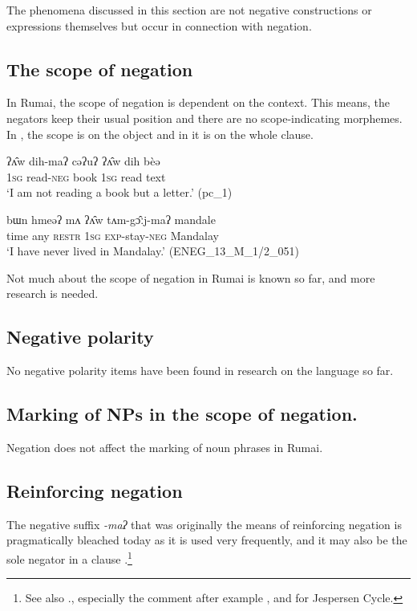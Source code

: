 \documentclass[output=paper,colorlinks,citecolor=brown]{langscibook}
\begin{document}
The phenomena discussed in this section are not negative constructions or expressions themselves but occur in connection with negation.

\subsection{The scope of negation} \label{sec:rum:4.1}

In Rumai, the scope of negation is dependent on the context. This means, the negators keep their usual position and there are no scope-indicating morphemes. In , the scope is on the object and in  it is on the whole clause.

\ea\label{ex:rum:71}
    \gll ʔʌ̂w	dih-maʔ	cəʔuʔ	ʔʌ̂w	dih	bèə \\
         1\textsc{sg} read-\textsc{neg} book 1\textsc{sg} read text \\
    \glt  ‘I am not reading a book but a letter.’ (pc\_1)
\z 

\ea\label{ex:rum:72}
    \gll bɯn	hmeəʔ	mʌ	ʔʌ̂w	tʌm-gɔ̂ːj-maʔ	mandale \\
         time any \textsc{restr} 1\textsc{sg} \textsc{exp}{}-stay-\textsc{neg} Mandalay \\
    \glt ‘I have never lived in Mandalay.’ (ENEG\_13\_M\_1/2\_051)
\z 

Not much about the scope of negation in Rumai is known so far, and more research is needed.

\subsection{Negative polarity} \label{sec:rum:4.2}

No negative polarity items have been found in research on the language so far.

\subsection{Marking of NPs in the scope of negation.} \label{sec:rum:4.3}

Negation does not affect the marking of noun phrases in Rumai.

\subsection{Reinforcing negation} \label{sec:rum:4.4}

The negative suffix \textit{{}-maʔ} that was originally the means of reinforcing negation is pragmatically bleached today as it is used very frequently, and it may also be the sole negator in a clause .\footnote{See also ., especially the comment after example , and  for Jespersen Cycle.}
\end{document}
